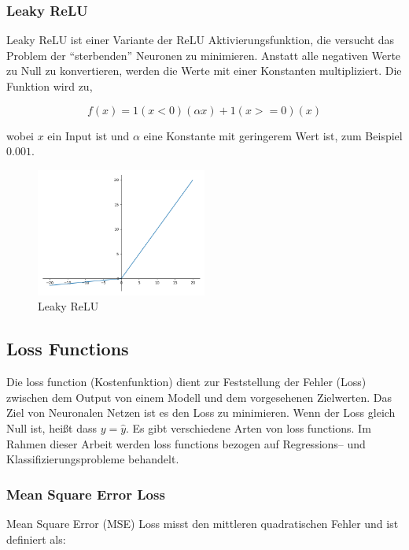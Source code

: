 \subsubsection{Leaky ReLU}
Leaky ReLU ist einer Variante der ReLU Aktivierungsfunktion, die versucht das Problem der ``sterbenden'' Neuronen zu minimieren. Anstatt alle negativen Werte
zu Null zu konvertieren, werden die Werte mit einer Konstanten multipliziert. Die Funktion wird zu,

\begin{equation}
  f(x) = 1(x < 0)(\alpha x) + 1(x >= 0)(x)
\end{equation}

wobei $x$ ein Input ist und $ \alpha $ eine Konstante mit geringerem Wert ist, zum Beispiel $ 0.001 $.

\begin{figure}[H]
  \centering
  \includegraphics[width=0.5\textwidth]{resources/nn/leaky-relu.png}
  \caption{
    Leaky ReLU
    \cite{leaky-relu}
  }
  \label{image:leaky-relu}
\end{figure}

\newpage
\subsection{Loss Functions}
Die \gls{loss function} (Kostenfunktion) dient zur Feststellung der Fehler (Loss) zwischen dem Output von einem Modell und dem vorgesehenen Zielwerten.
Das Ziel von Neuronalen Netzen ist es den Loss zu minimieren. Wenn der Loss gleich Null ist, heißt dass $ y = \hat{y} $. Es gibt verschiedene Arten
von \gls{loss function}s. Im Rahmen dieser Arbeit werden \gls{loss function}s bezogen auf Regressions– und Klassifizierungsprobleme behandelt.

\subsubsection{Mean Square Error Loss}
Mean Square Error (MSE) Loss misst den mittleren quadratischen Fehler und ist definiert als:

